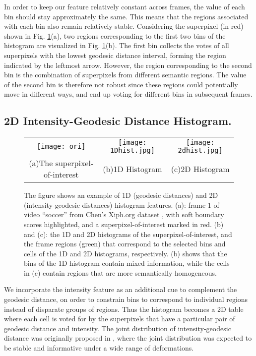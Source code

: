 \documentclass[runningheads]{llncs}
\begin{document}
In order to keep our feature relatively constant across frames, the value of each bin should stay approximately the same. This means that the regions associated with each bin also remain relatively stable. Considering the superpixel (in red) shown in Fig. \ref{fig:main1}(a), two regions corresponding to the first two bins of the histogram are visualized in Fig. \ref{fig:main1}(b). The first bin collects the votes of all superpixels with the lowest geodesic distance interval, forming the region indicated by the leftmost arrow. However, the region corresponding to the second bin is the combination of superpixels from different semantic regions. The value of the second bin is therefore not robust since these regions could potentially move in different ways, and end up voting for different bins in  subsequent frames. 


\subsection{2D Intensity-Geodesic Distance Histogram.}  \begin{figure}[!t]
\begin{center}
\begin{tabular}{ccc}
\texttt{[image: ori]}&
\texttt{[image: 1Dhist.jpg]}&
\texttt{[image: 2dhist.jpg]}\\
(a)The superpixel-of-interest&(b)1D Histogram&(c)2D Histogram\\
\end{tabular}
\end{center}
\caption{The figure shows an example of 1D (geodesic distances) and 2D (intensity-geodesic distances) histogram features. (a): frame 1 of video ``soccer'' from Chen's Xiph.org dataset \cite{Chen_dataset}, with soft boundary scores highlighted, and a superpixel-of-interest marked in red. (b) and (c): the 1D and 2D histograms of the superpixel-of-interest, and the frame regions (green) that correspond to the selected bins and cells of the 1D and 2D histograms, respectively. (b) shows that the bins of the 1D histogram contain mixed information, while the cells in (c) contain regions that are more semantically homogeneous.}
\label{fig:main1}
\end{figure}
We incorporate the intensity feature as an additional cue  to complement the geodesic distance, on order to constrain bins to correspond to individual regions instead of disparate groups of regions. Thus the histogram becomes a 2D table where each cell is voted for by the superpixels that have a particular pair of geodesic distance and intensity. The joint distribution of  intensity-geodesic distance was originally proposed in \cite{geohis}, where the joint distribution was expected to be stable and informative under a wide range of deformations.
\end{document}
